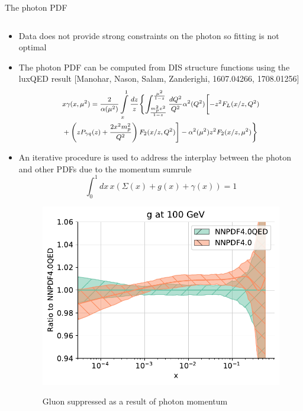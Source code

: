 \documentclass[8pt,t]{beamer}
\begin{document}
\begin{frame}{The photon PDF}
  \begin{columns}
    \begin{column}{0.59\textwidth}
      \begin{itemize}
        \item Data does not provide strong constraints on the photon so fitting is not optimal

        \item The photon PDF can be computed from DIS structure functions using the luxQED result {\color{gray}\footnotesize[Manohar, Nason, Salam, Zanderighi, 1607.04266, 1708.01256]}
        \begin{equation*}\footnotesize
          \begin{split}
            & x \gamma(x, \mu^2)
            =
            \frac{2}{\alpha (\mu^2)} \int\limits_x^1 \frac{dz}{z}
            \Biggl\{ \int_{m_p^2x^2 \over 1-z}^{\mu^2 \over 1-z} \frac{dQ^2}{Q^2}
            \alpha^2(Q^2) \Biggl[ -z^2 F_L(x/z, Q^2) \\
            & + \left( z P_{\gamma q}(z) + \frac{2 x^2 m_p^2}{Q^2} \right)
            F_2(x/z, Q^2)\Biggr] - \alpha^2(\mu^2) z^2 F_2(x/z, \mu^2)\Biggr\}
          \end{split}
        \end{equation*}

        \item An iterative procedure  is used to address the interplay between the photon and other PDFs due to the momentum sumrule
        \begin{equation*}
          \int_0^1 dx\, x \left( \Sigma(x) + g(x) + \gamma(x) \right) =1
        \end{equation*}

        \begin{figure}
          \includegraphics[width=.55\textwidth]{figures/plot_pdfs_g_qed.pdf}\\
          \caption*{Gluon suppressed as a result of photon momentum}
        \end{figure}
      \end{itemize}
    \end{column}


\end{columns}
\end{frame}
\end{document}
